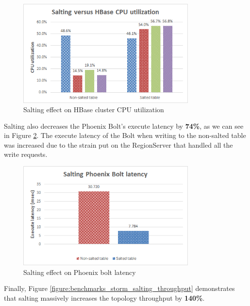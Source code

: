 \begin{figure}[H]
\centering
\includegraphics[width=0.8\textwidth]{figures/benchmarks_storm_salting_cpu}
\caption{Salting effect on HBase cluster CPU utilization}
\label{figure:benchmarks_storm_salting_cpu}
\end{figure}

Salting also decreases the Phoenix Bolt's execute latency by \textbf{74\%}, as we can see in Figure \ref{figure:benchmarks_storm_salting_latency}. The execute latency of the Bolt when writing to the non-salted table was increased due to the strain put on the RegionServer that handled all the write requests.

\begin{figure}[H]
\centering
\includegraphics[width=0.8\textwidth]{figures/benchmarks_storm_salting_latency}
\caption{Salting effect on Phoenix bolt latency}
\label{figure:benchmarks_storm_salting_latency}
\end{figure}

Finally, Figure \ref{figure:benchmarks_storm_salting_throughput} demonstrates that salting massively increases the topology throughput by \textbf{140\%}.


